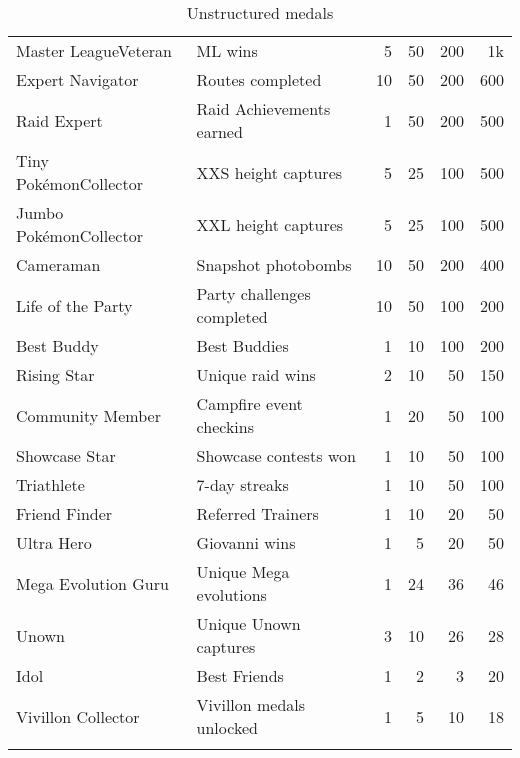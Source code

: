\begin{longtable}{m{}m{}rrrr}
Master League\newline{}Veteran & ML wins & 5 & 50 & 200 & 1k\\
Expert Navigator & Routes completed & 10 & 50 & 200 & 600\\
Raid Expert & Raid Achievements earned & 1 & 50 & 200 & 500\\
Tiny Pokémon\newline{}Collector & XXS height captures & 5 & 25 & 100 & 500\\
Jumbo Pokémon\newline{}Collector & XXL height captures & 5 & 25 & 100 & 500\\
Cameraman & Snapshot photobombs & 10 & 50 & 200 & 400\\
Life of the Party & Party challenges completed & 10 & 50 & 100 & 200\\
Best Buddy & Best Buddies & 1 & 10 & 100 & 200\\
Rising Star & Unique raid wins & 2 & 10 & 50 & 150\\
Community Member & Campfire event checkins & 1 & 20 & 50 & 100\\
Showcase Star & Showcase contests won & 1 & 10 & 50 & 100\\
Triathlete & 7-day streaks & 1 & 10 & 50 & 100\\
Friend Finder & Referred Trainers & 1 & 10 & 20 & 50\\
Ultra Hero & Giovanni wins & 1 & 5 & 20 & 50\\
Mega Evolution Guru & Unique Mega evolutions & 1 & 24 & 36 & 46\\
Unown & Unique Unown captures & 3 & 10 & 26 & 28\\
Idol & Best Friends & 1 & 2 & 3 & 20\\
Vivillon Collector & Vivillon medals unlocked & 1 & 5 & 10 & 18\\
\caption{Unstructured medals\label{table:medals}}
\end{longtable}
\endgroup
%
